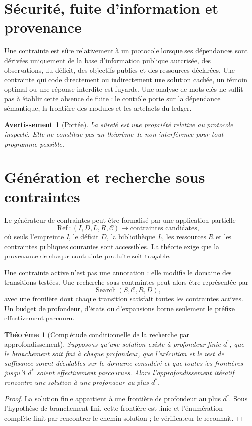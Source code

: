 \documentclass[11pt,a4paper,openany]{book}
\newtheorem{theorem}[definition]{Théorème}
\newtheorem{warning}[definition]{Avertissement}
\begin{document}
\section{Sécurité, fuite d'information et provenance}
Une contrainte est sûre relativement à un protocole lorsque ses dépendances sont dérivées uniquement de la base d'information publique autorisée, des observations, du déficit, des objectifs publics et des ressources déclarées. Une contrainte qui code directement ou indirectement une solution cachée, un témoin optimal ou une réponse interdite est fuyarde. Une analyse de mots-clés ne suffit pas à établir cette absence de fuite : le contrôle porte sur la dépendance sémantique, la frontière des modules et les artefacts du ledger.

\begin{warning}[Portée]
La sûreté est une propriété relative au protocole inspecté. Elle ne constitue pas un théorème de non-interférence pour tout programme possible.
\end{warning}

\section{Génération et recherche sous contraintes}
Le générateur de contraintes peut être formalisé par une application partielle
\[
\operatorname{Ref}: (I,D,L,R,\mathcal C)\longmapsto\text{contraintes candidates},
\]
où seuls l'empreinte $I$, le déficit $D$, la bibliothèque $L$, les ressources $R$ et les contraintes publiques courantes sont accessibles. La théorie exige que la provenance de chaque contrainte produite soit traçable.

Une contrainte active n'est pas une annotation : elle modifie le domaine des transitions testées. Une recherche sous contraintes peut alors être représentée par
\[
\operatorname{Search}(S,\mathcal C,R,D),
\]
avec une frontière dont chaque transition satisfait toutes les contraintes actives. Un budget de profondeur, d'états ou d'expansions borne seulement le préfixe effectivement parcouru.

\begin{theorem}[Complétude conditionnelle de la recherche par approfondissement]
Supposons qu'une solution existe à profondeur finie $d^*$, que le branchement soit fini à chaque profondeur, que l'exécution et le test de suffisance soient décidables sur le domaine considéré et que toutes les frontières jusqu'à $d^*$ soient effectivement parcourues. Alors l'approfondissement itératif rencontre une solution à une profondeur au plus $d^*$.
\end{theorem}
\begin{proof}
La solution finie appartient à une frontière de profondeur au plus $d^*$. Sous l'hypothèse de branchement fini, cette frontière est finie et l'énumération complète finit par rencontrer le chemin solution ; le vérificateur le reconnaît.
\end{proof}
\end{document}
